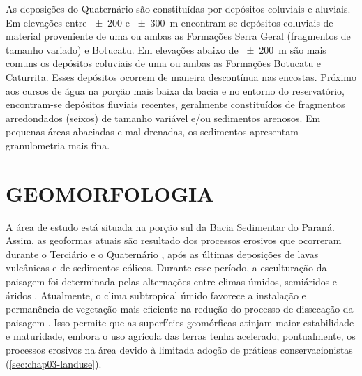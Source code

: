 As deposições do Quaternário são constituídas por depósitos coluviais e aluviais. Em elevações entre 
\num{\pm200} e \SI{\pm300}{\metre} encontram-se depósitos coluviais de material proveniente de uma ou ambas as 
Formações Serra Geral (fragmentos de tamanho variado) e Botucatu. Em elevações abaixo de \SI{\pm200}{\metre} 
são mais comuns os depósitos coluviais de uma ou ambas as Formações Botucatu e Caturrita. Esses depósitos 
ocorrem de maneira descontínua nas encostas. Próximo aos cursos de água na porção mais baixa da bacia e no 
entorno do reservatório, encontram-se depósitos fluviais recentes, geralmente constituídos de fragmentos 
arredondados (seixos) de tamanho variável e/ou sedimentos arenosos. Em pequenas áreas abaciadas e mal 
drenadas, os sedimentos apresentam granulometria mais fina.

\section{GEOMORFOLOGIA}
\label{sec:chap03-geomorfologia}

A área de estudo está situada na porção sul da Bacia Sedimentar do Paraná. Assim, as geoformas atuais são 
resultado dos processos erosivos que ocorreram durante o Terciário e o Quaternário \cite{Sartori2009}, após as 
últimas deposições de lavas vulcânicas e de sedimentos eólicos. Durante esse período, a esculturação da 
paisagem foi determinada pelas alternações entre climas úmidos, semiáridos e áridos \cite{Sartori2009}. 
Atualmente, o clima subtropical úmido favorece a instalação e permanência de vegetação mais eficiente na 
redução do processo de dissecação da paisagem \cite{Sartori2009, NascimentoEtAl2010}. Isso permite que as 
superfícies geomórficas atinjam maior estabilidade e maturidade, embora o uso agrícola das terras tenha 
acelerado, pontualmente, os processos erosivos na área devido à limitada adoção de práticas conservacionistas 
(\autoref{sec:chap03-landuse}).

